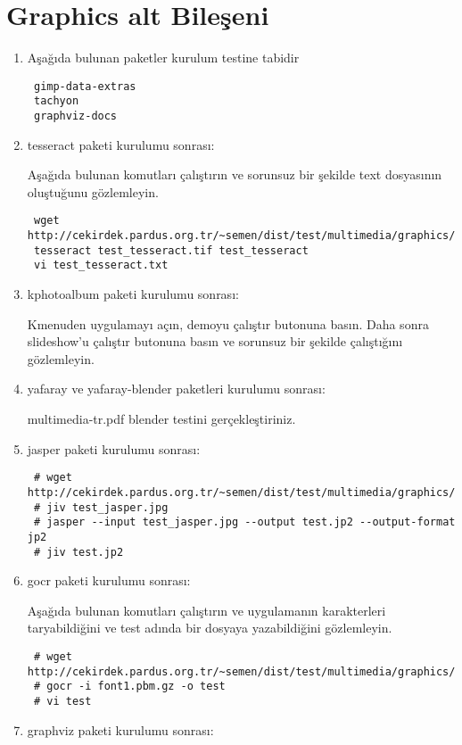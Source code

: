 \documentclass[a4paper,10pt]{article}
\begin{document}
\section{Graphics alt Bileşeni}
\begin{enumerate}
 \item Aşağıda bulunan paketler kurulum testine tabidir
\begin{verbatim}
 gimp-data-extras
 tachyon
 graphviz-docs
\end{verbatim}
\item tesseract paketi kurulumu sonrası:

Aşağıda bulunan komutları çalıştırın ve sorunsuz bir şekilde text dosyasının oluştuğunu gözlemleyin.
\begin{verbatim}
 wget http://cekirdek.pardus.org.tr/~semen/dist/test/multimedia/graphics/test_tesseract.tif
 tesseract test_tesseract.tif test_tesseract
 vi test_tesseract.txt
\end{verbatim}


\item kphotoalbum paketi kurulumu sonrası:

Kmenuden uygulamayı açın, demoyu çalıştır butonuna basın. Daha sonra slideshow'u çalıştır butonuna basın ve sorunsuz bir şekilde çalıştığını gözlemleyin.

\item yafaray ve yafaray-blender paketleri kurulumu sonrası:

multimedia-tr.pdf blender testini gerçekleştiriniz.
\item jasper paketi kurulumu sonrası:

\begin{verbatim}
 # wget http://cekirdek.pardus.org.tr/~semen/dist/test/multimedia/graphics/test_jasper.jpg
 # jiv test_jasper.jpg
 # jasper --input test_jasper.jpg --output test.jp2 --output-format jp2
 # jiv test.jp2
\end{verbatim}


 \item gocr paketi kurulumu sonrası:

Aşağıda bulunan komutları çalıştırın ve uygulamanın karakterleri taryabildiğini ve test adında bir dosyaya yazabildiğini gözlemleyin.
\begin{verbatim}
 # wget http://cekirdek.pardus.org.tr/~semen/dist/test/multimedia/graphics/font1.pbm.gz
 # gocr -i font1.pbm.gz -o test
 # vi test
\end{verbatim}

\item graphviz paketi kurulumu sonrası:


\end{enumerate}
\end{document}
